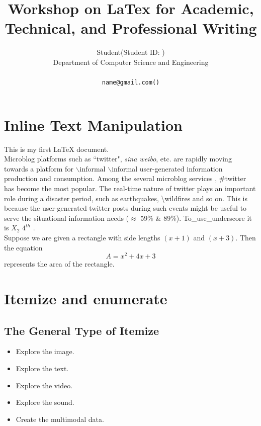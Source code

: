 \documentclass[11pt]{article}
\title{Workshop on LaTex for Academic, Technical, and Professional Writing}
\author{Student(Student ID: )\\
 Department of Computer Science and Engineering\\
 \affaddr{University of Chittagong, Chittagong, Bangladesh}\\
 {\tt name@gmail.com(\Letter)}\\
}
\begin{document}
\maketitle

\pagestyle{plain}

\section{Inline Text Manipulation} %
\label{ref:inlineText} %
This is my first LaTeX document.\\

\noindent Microblog platforms such as ``twitter", \emph{sina weibo}, etc. are rapidly moving towards a platform for $\backslash{\mbox{informal}}$ $\backslash$informal user-generated information production and consumption. Among the several microblog services , \#twitter has become the most popular. The real-time nature of twitter plays an {\color{red} important role during a disaster period}, {\color[HTML]{32a852} such as earthquakes}, \textbackslash{wildfires} and so on. This is because the user-generated twitter posts during such events might be useful to serve the situational information needs ($\approx$ 59\% \& 89\%). To\_use\_underscore it is $X_{2}$ $4^{th}$ . \\

Suppose we are given a rectangle with side lengths $(x+1)$ and $(x+3)$. Then the equation $$A=x^2+4x+3$$ represents the area of the rectangle.\\


\section{Itemize and enumerate}
\label{ref:itemize}

\subsection{The General Type of Itemize}
\begin{itemize}
\item Explore the image.
\item Explore the text.
\item Explore the video.
\item Explore the sound.
\item Create the multimodal data.
\end{itemize}
\end{document}

